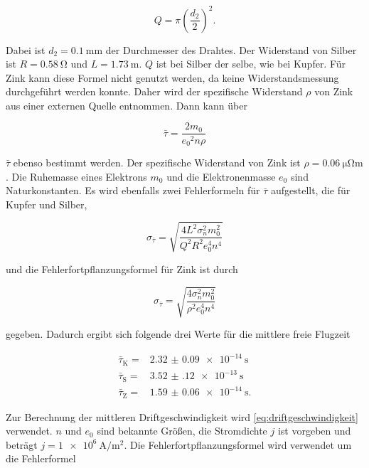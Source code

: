 \begin{equation}
    Q = \pi \left(\frac{d_2}{2}\right)^2.
    \label{eq:Q}
\end{equation}

Dabei ist $d_2 = \SI{0.1}{\milli\meter}$ der Durchmesser des Drahtes.
Der Widerstand von Silber ist $R = \SI{0.58}{\ohm}$ und $L = \SI{1.73}{\meter}$.
$Q$ ist bei Silber der selbe, wie bei Kupfer.
Für Zink kann diese Formel nicht genutzt werden, da keine Widerstandsmessung durchgeführt werden konnte.
Daher wird der spezifische Widerstand $\rho$ von Zink aus einer externen Quelle entnommen.
Dann kann über 

\begin{equation}
    \bar{\tau} = \frac{2m_0}{{e_0}^2 n \rho}
    \label{eq:tau2}
\end{equation}

$\bar{\tau}$ ebenso bestimmt werden.
Der spezifische Widerstand von Zink ist $\rho = \SI{0.06}{\micro\ohm\meter}$.\cite{zink}
Die Ruhemasse eines Elektrons $m_0$ und die Elektronenmasse $e_0$ sind Naturkonstanten.\cite{physics_constants}
Es wird ebenfalls zwei Fehlerformeln für $\bar{\tau}$ aufgestellt, die für Kupfer und Silber, 

\begin{equation}
    \sigma _{\bar{\tau}} = \sqrt{\frac{4 L^{2} \sigma_{n}^{2} m_{0}^{2}}{Q^{2} R^{2} e_{0}^{4} n^{4}}}
    \label{eq:tau_fehler}
\end{equation}

und die Fehlerfortpflanzungsformel für Zink ist durch

\begin{equation}
    \sigma _{\bar{\tau}} = \sqrt{\frac{4 \sigma_{n}^{2} m_{0}^{2}}{{\rho}^{2} e_{0}^{4} n^{4}}}
    \label{eq:tau_fehler2}
\end{equation}

gegeben. 
Dadurch ergibt sich folgende drei Werte für die mittlere freie Flugzeit

\begin{align}
    \bar{\tau}_\text{K} =& \SI{2.32(9)e-14}{\second} \\
    \bar{\tau}_\text{S} =& \SI{3.52(12)e-13}{\second} \\
    \bar{\tau}_\text{Z} =& \SI{1.59(6)e-14}{\second}.
    \label{eq:tau1}
\end{align}

Zur Berechnung der mittleren Driftgeschwindigkeit wird \autoref{eq:driftgeschwindigkeit} verwendet.
$n$ und $e_0$ sind bekannte Größen, die Stromdichte $j$ ist vorgeben und beträgt $j = \SI{1e6}{\ampere\per\meter\squared}$.
Die Fehlerfortpflanzungsformel wird verwendet um die Fehlerformel

